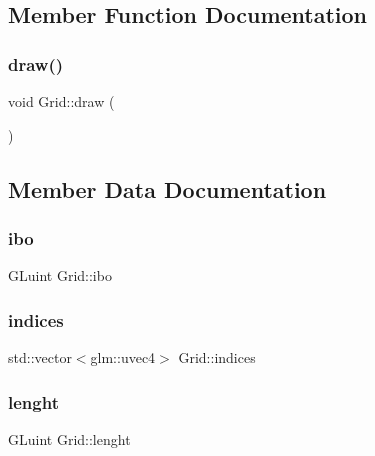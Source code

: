 \subsection{Member Function Documentation}
\mbox{\label{classGrid_a96cdcd08912ae8330b1d81906e29dc68}} 
\subsubsection{\texorpdfstring{draw()}{draw()}}
{\footnotesize\ttfamily void Grid\+::draw (\begin{DoxyParamCaption}{ }\end{DoxyParamCaption})}



\subsection{Member Data Documentation}
\mbox{\label{classGrid_a9a3ae4bb51f9583d5695007e606536c1}} 
\subsubsection{\texorpdfstring{ibo}{ibo}}
{\footnotesize\ttfamily G\+Luint Grid\+::ibo\hspace{0.3cm}{\ttfamily [private]}}

\mbox{\label{classGrid_a688eebc4f8d8f25e8da058a188419f5b}} 
\subsubsection{\texorpdfstring{indices}{indices}}
{\footnotesize\ttfamily std\+::vector$<$glm\+::uvec4$>$ Grid\+::indices\hspace{0.3cm}{\ttfamily [private]}}

\mbox{\label{classGrid_a0dcafd46273017f38eaf9791b9f82311}} 
\subsubsection{\texorpdfstring{lenght}{lenght}}
{\footnotesize\ttfamily G\+Luint Grid\+::lenght\hspace{0.3cm}{\ttfamily [private]}}

